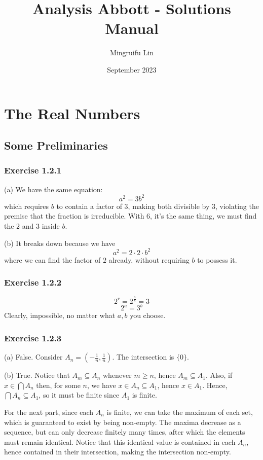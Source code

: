 \documentclass{book}
\title{Analysis Abbott - Solutions Manual}
\author{Mingruifu Lin}
\date{September 2023}
\begin{document}
\maketitle

\tableofcontents

\chapter{The Real Numbers}

\section{}
\section{Some Preliminaries}

\subsection*{Exercise 1.2.1}
(a)
We have the same equation:
$$a^2 = 3b^2$$
which requires $b$ to contain a factor of $3$, making both divisible by $3$, violating the premise that the fraction is irreducible. With $6$, it's the same thing, we must find the $2$ and $3$ inside $b$.

\noindent
(b)
It breaks down because we have
$$a^2 = 2 \cdot 2 \cdot b^2$$
where we can find the factor of $2$ already, without requiring $b$ to possess it.

\subsection*{Exercise 1.2.2}
$$2^r = 2^{\frac{a}{b}} = 3$$
$$2^a = 3^b$$
Clearly, impossible, no matter what $a, b$ you choose.

\subsection*{Exercise 1.2.3}
(a)
False. Consider $A_n = (-\frac{1}{n}, \frac{1}{n})$. The intersection is $\{0\}$.

\noindent
(b)
True. Notice that $A_m \subseteq A_n$ whenever $m \geq n$, hence $A_m \subseteq A_1$. Also, if $x \in \bigcap A_n$ then, for some $n$, we have $x \in A_n \subseteq A_1$, hence $x \in A_1$. Hence, $\bigcap A_n \subseteq A_1$, so it must be finite since $A_1$ is finite.

For the next part, since each $A_n$ is finite, we can take the maximum of each set, which is guaranteed to exist by being non-empty. The maxima decrease as a sequence, but can only decrease finitely many times, after which the elements must remain identical. Notice that this identical value is contained in each $A_n$, hence contained in their intersection, making the intersection non-empty.
\end{document}
